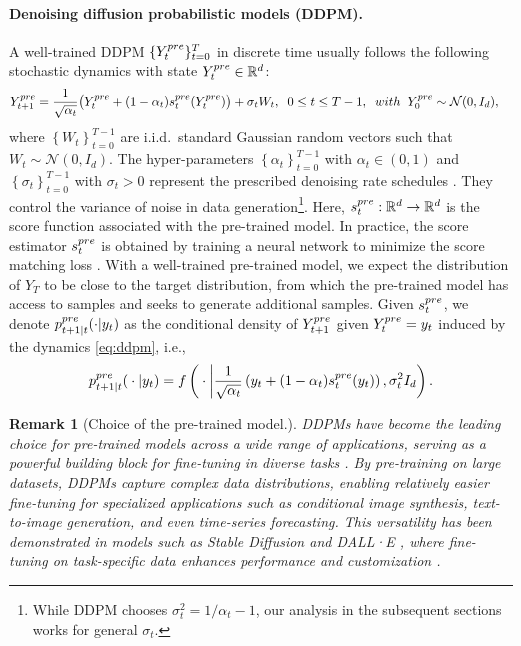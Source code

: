 \documentclass[10pt,a4paper]{amsart}
\newtheorem{Remark}[Theorem]{Remark}
\newcommand{\curly}[1]{\left\lbrace #1 \right\rbrace}
\newcommand{\parenthesis}[1]{\left( #1 \right)}
\newcommand{\mcal}[1]{\mathcal{#1}}
\begin{document}
\paragraph{Denoising diffusion probabilistic models (DDPM).} A well-trained DDPM $\{Y_t^{\rm pre}\}_{t=0}^T$ in discrete time usually follows the following stochastic dynamics with state $Y_t^{\rm pre}\in \mathbb{R}^d$:
\begin{align}
    Y_{t+1}^{\rm pre} & = \frac{1}{\sqrt{\alpha_t}}\big(Y_t^{\rm pre} + (1 - \alpha_t)s^{\rm pre}_t(Y_t^{\rm pre})\big) + \sigma_t W_t,   \;\; 0 \leq t \leq T - 1, \;\; \textit{with}\;\; Y_0^{\rm pre} \sim \mcal{N}(0, I_d),\label{eq:ddpm}
\end{align}
where $\curly{W_t}_{t = 0}^{T - 1}$ are i.i.d.~standard Gaussian random vectors such that $W_t\sim \mathcal{N}(0,I_d)$. The hyper-parameters $\curly{\alpha_t}_{t=0}^{T-1}$ with  $\alpha_t\in (0, 1)$ and $\curly{\sigma_t}_{t=0}^{T-1}$ with $\sigma_t>0$ represent the prescribed denoising rate schedules \cite{Ho20,li2023towards}. They control the variance of noise in data generation\footnote{While DDPM chooses $\sigma_t^2 = 1/\alpha_t - 1$, our analysis in the subsequent sections works for general $\sigma_t$.}.  Here, $s^{\rm pre}_t:\mathbb{R}^d \rightarrow\mathbb{R}^d$ is the score function associated with the pre-trained model. In practice, the score estimator $s_t^{\rm pre}$  is obtained by training a neural network to minimize the score matching loss \cite{hyvarinen2005estimation}. {With a well-trained pre-trained model, we expect the distribution of $Y_T$ to be close to the target distribution, from which the pre-trained model has access to samples and seeks to generate additional samples.} Given $s_t^{\rm pre}$, we denote $ p_{t+1 \vert t}^{\rm pre}(\cdot \vert y_t) $ as the conditional density of $Y_{t+1}^{\rm pre}$ given $Y_t^{\rm pre} = y_t$ induced by the dynamics \eqref{eq:ddpm}, i.e., 
\begin{align*}
    p_{t+1\vert t}^{\rm pre}({}\cdot{}\vert y_{t}) = f\parenthesis{{}\cdot{}\bigg\vert\frac{1}{\sqrt{\alpha_t}}\parenthesis{y_t + (1 - \alpha_t)s^{\rm pre}_t(y_t)}, \sigma_{t}^{2} I_d}.
\end{align*}


%

\begin{Remark}[Choice of the pre-trained model.]
    DDPMs have become the leading choice for pre-trained models across a wide range of applications, serving as a powerful building block for fine-tuning in diverse tasks \cite{dhariwal2021diffusion,Ho20,watson2023novo,li2023towards}.  By pre-training on large datasets, DDPMs capture complex data distributions, enabling relatively easier fine-tuning for specialized applications such as conditional image synthesis, text-to-image generation, and even time-series forecasting. This versatility has been demonstrated in models such as Stable Diffusion \cite{rombach2022high} and DALL·E \cite{ramesh2022hierarchical}, where fine-tuning on task-specific data enhances performance and customization \cite{fan2024reinforcement}. 
\end{Remark}
\end{document}
